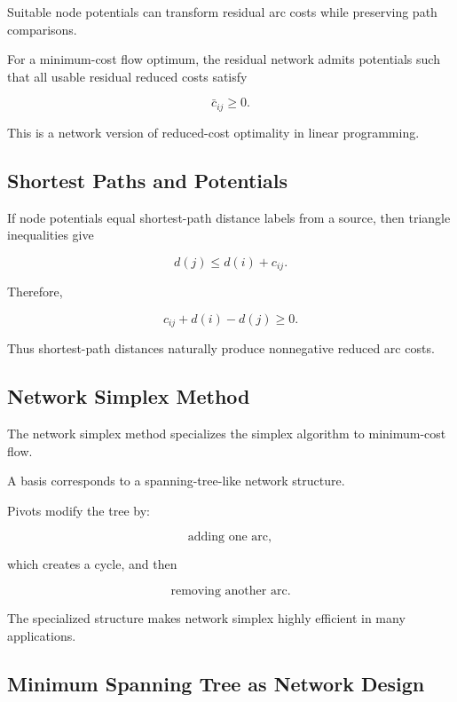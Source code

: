 Suitable node potentials can transform residual arc costs while preserving
path comparisons.

For a minimum-cost flow optimum, the residual network admits potentials
such that all usable residual reduced costs satisfy

\[
\boxed{
\bar{c}_{ij}\geq0.
}
\]

This is a network version of reduced-cost optimality in linear
programming.

\subsection{Shortest Paths and Potentials}
\label{subsec:shortest-path-potentials}

If node potentials equal shortest-path distance labels from a source, then
triangle inequalities give

\[
\boxed{
d(j)
\leq
d(i)+c_{ij}.
}
\]

Therefore,

\[
\boxed{
c_{ij}
+
d(i)
-
d(j)
\geq0.
}
\]

Thus shortest-path distances naturally produce nonnegative reduced arc
costs.

\subsection{Network Simplex Method}
\label{subsec:network-simplex}

The network simplex method specializes the simplex algorithm to
minimum-cost flow.

A basis corresponds to a spanning-tree-like network structure.

Pivots modify the tree by:

\[
\boxed{
\text{adding one arc},
}
\]

which creates a cycle, and then

\[
\boxed{
\text{removing another arc}.
}
\]

The specialized structure makes network simplex highly efficient in many
applications.

\subsection{Minimum Spanning Tree as Network Design}
\label{subsec:minimum-spanning-tree-network}

